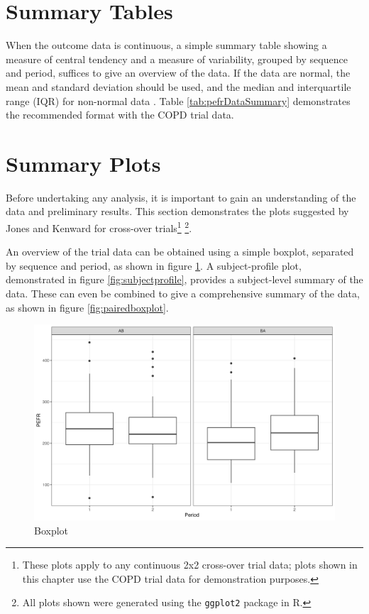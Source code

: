 \documentclass[12pt, TexShade, letterpaper]{report}
\begin{document}

\section{Summary Tables}
When the outcome data is continuous, a simple summary table showing a measure of central tendency and a measure of variability, grouped by sequence and period, suffices to give an overview of the data. If the data are normal, the mean and standard deviation should be used, and the median and interquartile range (IQR) for non-normal data \cite{vetter2017descriptive}. Table \ref{tab:pefrDataSummary} demonstrates the recommended format with the COPD trial data.



\section{Summary Plots}
Before undertaking any analysis, it is important to gain an understanding of the data and preliminary results. This section demonstrates the plots suggested by Jones and Kenward \cite{jones2003design} for cross-over trials\footnote{These plots  apply to any continuous 2x2 cross-over trial data; plots shown in this chapter use the COPD trial data for demonstration purposes.} \footnote{All plots shown were generated using the \texttt{ggplot2} package in R.}.

An overview of the trial data can be obtained using a simple boxplot, separated by sequence and period, as shown in figure \ref{fig:boxplot}. A subject-profile plot, demonstrated in figure \ref{fig:subjectprofile}, provides a subject-level summary of the data. These can even be combined to give a comprehensive summary of the data, as shown in figure \ref{fig:pairedboxplot}.

\begin{figure}[H]
    \centering
    \includegraphics[height=0.42\textheight, keepaspectratio]{report/figures/ch2/boxplot.png}
    \caption{Boxplot}
    \label{fig:boxplot}
\end{figure}
\end{document}
